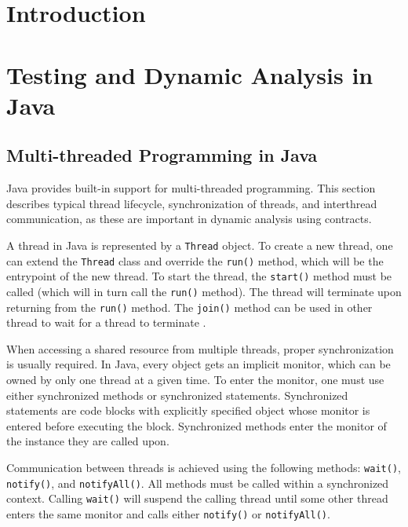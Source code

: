 \chapter{Introduction}

\todo{}



\chapter{Testing and Dynamic Analysis in Java}



\section{Multi-threaded Programming in Java}

Java provides built-in support for multi-threaded programming. This section
describes typical thread lifecycle, synchronization of threads, and interthread
communication, as these are important in dynamic analysis using contracts.

A thread in Java is represented by a \texttt{Thread} object. To create a new
thread, one can extend the \texttt{Thread} class and override the \texttt{run()}
method, which will be the entrypoint of the new thread. To start the thread,
the \texttt{start()} method must be called (which will in turn call the
\texttt{run()} method). The thread will terminate upon returning from the
\texttt{run()} method. The \texttt{join()} method can be used in other thread to
wait for a thread to terminate \cite{javaTheCompleteReference}.

When accessing a shared resource from multiple threads, proper synchronization
is usually required. In Java, every object gets an implicit monitor, which can
be owned by only one thread at a given time. To enter the monitor, one must use
either synchronized methods or synchronized statements. Synchronized statements
are code blocks with explicitly specified object whose monitor is entered before
executing the block. Synchronized methods enter the monitor of the instance they
are called upon. 

Communication between threads is achieved using the following methods:
\texttt{wait()}, \texttt{notify()}, and \texttt{notifyAll()}. All methods must
be called within a synchronized context. Calling \texttt{wait()} will suspend
the calling thread until some other thread enters the same monitor and calls
either \texttt{notify()} or \texttt{notifyAll()}.

